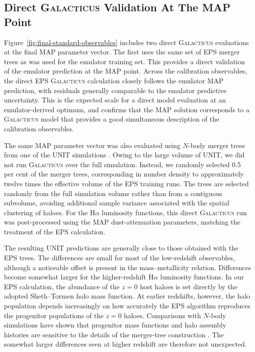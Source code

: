 \documentclass[twocolumn, apj, numberedappendix, iop]{openjournal}
\newcommand{\galacticus}{\textsc{Galacticus}\xspace}
\newcommand{\ha}{H$\alpha$}
\begin{document}
\subsection{Direct \galacticus{} Validation At The MAP Point}
\label{sec:direct-map-validation}

Figure~\ref{fig:final-standard-observables} includes two direct \galacticus{}
evaluations at the final MAP parameter vector. The first uses the same set of EPS
merger trees as was used for the emulator training set. This provides a direct
validation of the emulator prediction at the MAP point. Across the calibration observables, the direct EPS \galacticus{} calculation
closely follows the emulator MAP prediction, with residuals generally comparable
to the emulator predictive uncertainty. This is the expected scale for a direct
model evaluation at an emulator-derived optimum, and confirms that the MAP
solution corresponds to a \galacticus{} model that provides a good simultaneous
description of the calibration observables.

The same MAP parameter vector was also evaluated using \(N\)-body merger trees
from one of the UNIT simulations \citep{2019MNRAS.487...48C}. Owing to the large volume of UNIT, we did not run \galacticus{} over the full
simulation. Instead, we randomly selected 0.5 per cent of the merger trees,
corresponding in number density to approximately twelve times the effective
volume of the EPS training runs. The trees are selected randomly from the
full simulation volume rather than from a contiguous subvolume, avoiding
additional sample variance associated with the spatial clustering of haloes. For the \ha{} luminosity functions, this direct \galacticus{}
run was post-processed using the MAP dust-attenuation parameters, matching the
treatment of the EPS calculation.

The resulting UNIT predictions are generally close to those obtained with the
EPS trees. The differences are small for most of the low-redshift observables,
although a noticeable offset is present in the mass--metallicity
relation. Differences become somewhat larger for the higher-redshift
\ha{} luminosity functions. In our EPS calculation, the abundance of the
$z=0$ host haloes is set directly by the adopted Sheth--Tormen halo mass
function. At earlier redshifts, however, the halo population depends
increasingly on how accurately the EPS algorithm reproduces the progenitor
populations of the $z=0$ haloes. Comparisons with $N$-body simulations have
shown that progenitor mass functions and halo assembly histories are sensitive
to the details of the merger-tree construction
\citep[e.g.][]{2008MNRAS.383..546C,2008MNRAS.383..557P}.
The somewhat larger differences seen at higher redshift are therefore not
unexpected.
\end{document}
